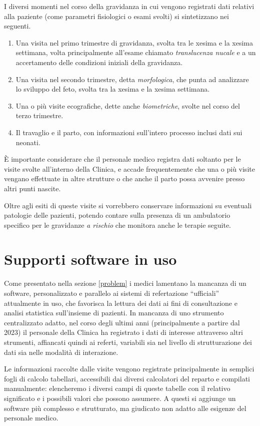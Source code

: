I diversi momenti nel corso della gravidanza in cui vengono registrati dati relativi alla paziente (come parametri fisiologici o esami svolti) si sintetizzano nei seguenti.

\begin{enumerate}
\item Una visita nel primo trimestre di gravidanza, svolta tra le xesima e la xesima settimana, volta principalmente all'esame chiamato \emph{translucenza nucale} e a un accertamento delle condizioni iniziali della gravidanza.
\item Una visita nel secondo trimestre, detta \emph{morfologica}, che punta ad analizzare lo sviluppo del feto, svolta tra la xesima e la xesima settimana.
\item Una o più visite ecografiche, dette anche \emph{biometriche}, svolte nel corso del terzo trimestre.
\item Il travaglio e il parto, con informazioni sull'intero processo inclusi dati sui neonati.
\end{enumerate}

È importante considerare che il personale medico registra dati soltanto per le visite svolte all'interno della Clinica, e accade frequentemente che una o più visite vengano effettuate in altre strutture o che anche il parto possa avvenire presso altri punti nascite.

Oltre agli esiti di queste visite si vorrebbero conservare informazioni su eventuali patologie delle pazienti, potendo contare sulla presenza di un ambulatorio specifico per le gravidanze \emph{a rischio} che monitora anche le terapie seguite.

\section{Supporti software in uso}

Come presentato nella sezione \ref{problem} i medici lamentano la mancanza di un software, personalizzato e parallelo ai sistemi di refertazione \enquote{ufficiali} attualmente in uso, che favorisca la lettura dei dati ai fini di consultazione e analisi statistica sull'insieme di pazienti.
In mancanza di uno strumento centralizzato adatto, nel corso degli ultimi anni (principalmente a partire dal 2023) il personale della Clinica ha registrato i dati di interesse attraverso altri strumenti, affiancati quindi ai referti, variabili sia nel livello di strutturazione dei dati sia nelle modalità di interazione.

Le informazioni raccolte dalle visite vengono registrate principalmente in semplici fogli di calcolo tabellari, accessibili dai diversi calcolatori del reparto e compilati manualmente: elencheremo i diversi campi di queste tabelle con il relativo significato e i possibili valori che possono assumere.
A questi si aggiunge un software più complesso e strutturato, ma giudicato non adatto alle esigenze del personale medico.

